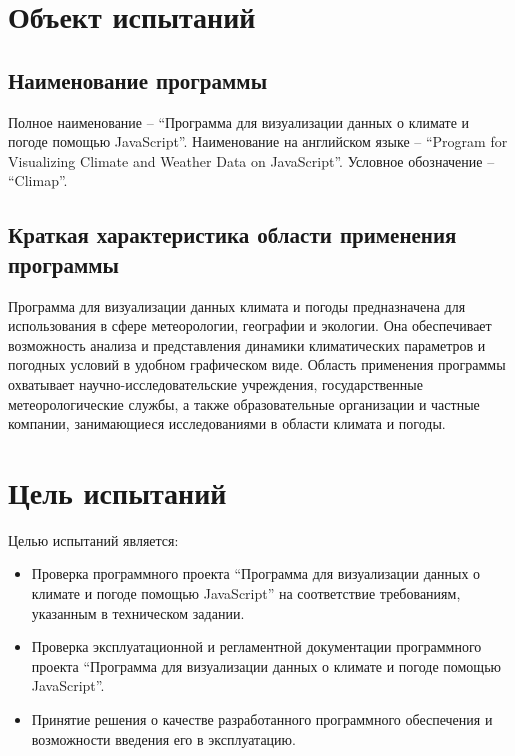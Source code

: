 \documentclass[a4paper, 12pt]{article}
\begin{document}
	   
	 \firstPage
	\newpage
	\thirdPage

	\newpage

	\section{Объект испытаний}
	\subsection{Наименование программы}
	Полное наименование -- \enquote{Программа для визуализации данных о климате и погоде помощью JavaScript}. Наименование
	на английском языке -- \enquote{Program for Visualizing Climate and Weather Data on JavaScript}. Условное обозначение
	-- \enquote{Climap}.

	\subsection{Краткая характеристика области применения программы}
	Программа для визуализации данных климата и погоды предназначена для использования в сфере метеорологии, географии и экологии.
	Она обеспечивает возможность анализа и представления динамики климатических параметров и погодных условий в удобном
	графическом виде. Область применения программы охватывает научно-исследовательские учреждения, государственные
	метеорологические службы, а также образовательные организации и частные компании, занимающиеся исследованиями в
	области климата и погоды.

	\section{Цель испытаний}
	Целью испытаний является:
	\begin{itemize}
		\item Проверка программного проекта \enquote{Программа для визуализации данных о климате и погоде помощью JavaScript}
			на соответствие требованиям, указанным в техническом задании.

		\item Проверка эксплуатационной и регламентной документации программного проекта \enquote{Программа для визуализации данных о климате и погоде помощью JavaScript}.

		\item Принятие решения о качестве разработанного программного обеспечения и возможности введения его в эксплуатацию.
	\end{itemize}
\end{document}
